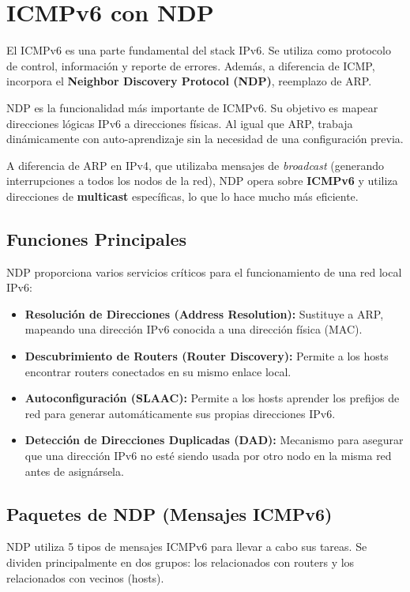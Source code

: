 \section{ICMPv6 con NDP}

El ICMPv6 es una parte fundamental del stack IPv6. Se utiliza como protocolo de control, información y reporte de errores. Además, a diferencia de ICMP, incorpora el \textbf{Neighbor Discovery Protocol (NDP)}, reemplazo de ARP.


NDP es la funcionalidad más importante de ICMPv6. Su objetivo es mapear direcciones lógicas IPv6 a direcciones físicas. Al igual que ARP, trabaja dinámicamente con auto-aprendizaje sin la necesidad de una configuración previa. 

A diferencia de ARP en IPv4, que utilizaba mensajes de \textit{broadcast} (generando interrupciones a todos los nodos de la red), NDP opera sobre \textbf{ICMPv6} y utiliza direcciones de \textbf{multicast} específicas, lo que lo hace mucho más eficiente.

\subsection{Funciones Principales}
NDP proporciona varios servicios críticos para el funcionamiento de una red local IPv6:
\begin{itemize}[label=\textcolor{acento}{$\bullet$}]
    \item \textbf{Resolución de Direcciones (Address Resolution):} Sustituye a ARP, mapeando una dirección IPv6 conocida a una dirección física (MAC).
    \item \textbf{Descubrimiento de Routers (Router Discovery):} Permite a los hosts encontrar routers conectados en su mismo enlace local.
    \item \textbf{Autoconfiguración (SLAAC):} Permite a los hosts aprender los prefijos de red para generar automáticamente sus propias direcciones IPv6.
    \item \textbf{Detección de Direcciones Duplicadas (DAD):} Mecanismo para asegurar que una dirección IPv6 no esté siendo usada por otro nodo en la misma red antes de asignársela.
\end{itemize}

\subsection{Paquetes de NDP (Mensajes ICMPv6)}
NDP utiliza 5 tipos de mensajes ICMPv6 para llevar a cabo sus tareas. Se dividen principalmente en dos grupos: los relacionados con routers y los relacionados con vecinos (hosts).

